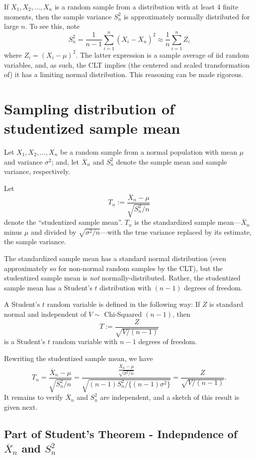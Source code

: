 \documentclass[]{book}
\begin{document}
If \(X_1, X_2, \ldots, X_n\) is a random sample from a distribution with
at least 4 finite moments, then the sample variance \(S_n^2\) is
approximately normally distributed for large \(n\). To see this, note
\[S_n^2 = \frac{1}{n-1}\sum_{i=1}^n (X_i - \overline X_n)^2 \approx \frac{1}{n}\sum_{i=1}^n Z_i\]
where \(Z_i = (X_i - \mu)^2\). The latter expression is a sample average
of iid random variables, and, as such, the CLT implies (the centered and
scaled transformation of) it has a limiting normal distribution. This
reasoning can be made rigorous.

\section{Sampling distribution of studentized sample
mean}\label{sampling-distribution-of-studentized-sample-mean}

Let \(X_1, X_2, \ldots, X_n\) be a random sample from a normal
population with mean \(\mu\) and variance \(\sigma^2\); and, let
\(\overline X_n\) and \(S_n^2\) denote the sample mean and sample
variance, respectively.

Let \[T_n:=\frac{\overline X_n - \mu}{\sqrt{S_n^2 / n}}\] denote the
``studentized sample mean''. \(T_n\) is the standardized sample
mean---\(\overline X_n\) minus \(\mu\) and divided by
\(\sqrt{\sigma^2/n}\)---with the true variance replaced by its estimate,
the sample variance.

The standardized sample mean has a standard normal distribution (even
approximately so for non-normal random samples by the CLT), but the
studentized sample mean is \emph{not} normally-distributed. Rather, the
studentized sample mean has a Student's \(t\) distribution with
\((n-1)\) degrees of freedom.

A Student's \(t\) random variable is defined in the following way: If
\(Z\) is standard normal and independent of \(V \sim\) Chi-Squared
\((n-1)\), then \[T:=\frac{Z}{\sqrt{V/(n-1)}}\] is a Student's \(t\)
random variable with \(n-1\) degrees of freedom.

Rewriting the studentized sample mean, we have
\[T_n = \frac{\overline X_n - \mu}{\sqrt{S_n^2 / n}} = \frac{\frac{\overline X_n - \mu}{\sqrt{\sigma^2 / n}}}{\sqrt{(n-1)S_n^2/\{(n-1)\sigma^2\}}} = \frac{Z}{\sqrt{V/(n-1)}}.\]
It remains to verify \(\overline X_n\) and \(S_n^2\) are independent,
and a sketch of this result is given next.

\subsection{\texorpdfstring{Part of Student's Theorem - Indepndence of
\(\overline X_n\) and
\(S_n^2\)}{Part of Student's Theorem - Indepndence of \textbackslash{}overline X\_n and S\_n\^{}2}}\label{part-of-students-theorem---indepndence-of-overline-x_n-and-s_n2}
\end{document}
